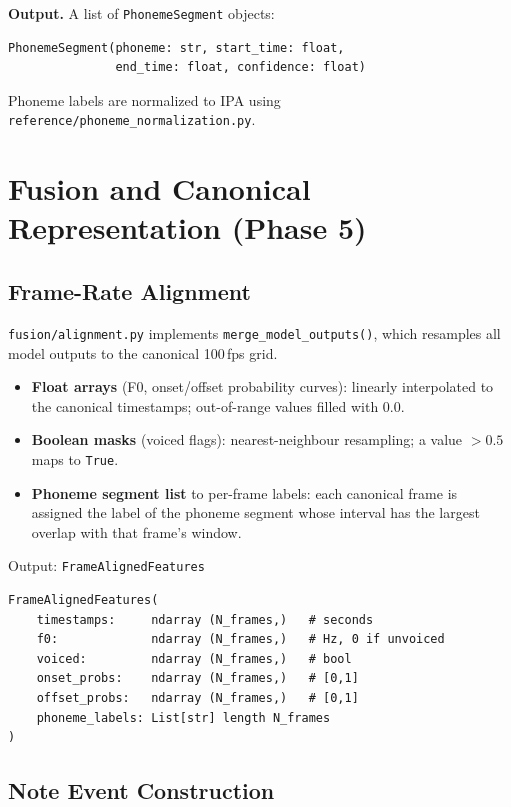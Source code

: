 \documentclass[11pt,letterpaper]{article}
\begin{document}
\textbf{Output.}
A list of \texttt{PhonemeSegment} objects:
\begin{lstlisting}
PhonemeSegment(phoneme: str, start_time: float,
               end_time: float, confidence: float)
\end{lstlisting}
Phoneme labels are normalized to IPA using
\texttt{reference/phoneme\_normalization.py}.

\section{Fusion and Canonical Representation (Phase 5)}
\label{sec:fusion}

\subsection{Frame-Rate Alignment}

\texttt{fusion/alignment.py} implements \texttt{merge\_model\_outputs()},
which resamples all model outputs to the canonical 100\,fps grid.

\begin{itemize}[noitemsep]
  \item \textbf{Float arrays} (F0, onset/offset probability curves):
        linearly interpolated to the canonical timestamps;
        out-of-range values filled with 0.0.
  \item \textbf{Boolean masks} (voiced flags):
        nearest-neighbour resampling; a value $> 0.5$ maps to \texttt{True}.
  \item \textbf{Phoneme segment list} to per-frame labels:
        each canonical frame is assigned the label of the phoneme segment
        whose interval has the largest overlap with that frame's window.
\end{itemize}

Output: \texttt{FrameAlignedFeatures}
\begin{lstlisting}
FrameAlignedFeatures(
    timestamps:     ndarray (N_frames,)   # seconds
    f0:             ndarray (N_frames,)   # Hz, 0 if unvoiced
    voiced:         ndarray (N_frames,)   # bool
    onset_probs:    ndarray (N_frames,)   # [0,1]
    offset_probs:   ndarray (N_frames,)   # [0,1]
    phoneme_labels: List[str] length N_frames
)
\end{lstlisting}

\subsection{Note Event Construction}
\end{document}
